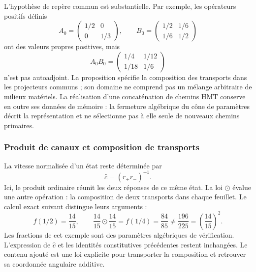 L’hypothèse de repère commun est substantielle. Par exemple, les opérateurs
positifs définis
\[
 A_0=\begin{pmatrix}1/2&0\\0&1/3\end{pmatrix},\qquad
 B_0=\begin{pmatrix}1/2&1/6\\1/6&1/2\end{pmatrix}
\]
ont des valeurs propres positives, mais
\[
 A_0B_0=\begin{pmatrix}1/4&1/12\\1/18&1/6\end{pmatrix}
\]
n’est pas autoadjoint. La proposition spécifie la composition des
transports dans les projecteurs communs ; son domaine ne comprend pas un mélange
arbitraire de milieux matériels. La réalisation d’une concaténation de
chemins HMT conserve en outre ses données de mémoire : la fermeture algébrique du
cône de paramètres décrit la représentation et ne sélectionne pas à elle seule
de nouveaux chemins primaires.

\subsubsection{Produit de canaux et composition de transports}

La vitesse normalisée d’un état reste déterminée par
\[
 \widehat c=(r_+r_-)^{-1}.
\]
Ici, le produit ordinaire réunit les deux réponses de ce même état.
La loi $\odot$ évalue une autre opération : la composition de deux transports
dans chaque feuillet. Le calcul exact suivant distingue leurs arguments :
\begin{equation}
 f(1/2)=\frac{14}{15},\qquad
 \frac{14}{15}\odot\frac{14}{15}=f(1/4)=\frac{84}{85}
 \ne\frac{196}{225}=\left(\frac{14}{15}\right)^2.
 \label{amp-comp-rational-example}
\end{equation}
Les fractions de cet exemple sont des paramètres algébriques de vérification.
L’expression de $\widehat c$ et les identités constitutives précédentes
restent inchangées. Le contenu ajouté est une loi explicite pour
transporter la composition et retrouver sa coordonnée angulaire additive.
